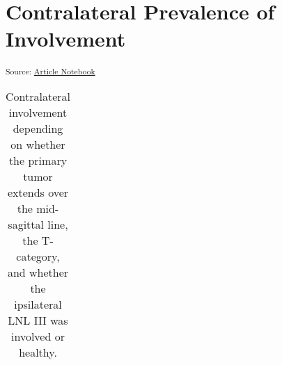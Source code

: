 \documentclass[
  sn-mathphys-num,
]{sn-jnl}
\begin{document}
\section{Contralateral Prevalence of
Involvement}\label{contralateral-prevalence-of-involvement}

\textsubscript{Source:
\href{https://rmnldwg.github.io/bilateral-paper/manuscript.qmd.html}{Article
Notebook}}

\begin{longtable}[]{@{}llllllllllll@{}}

\caption{\label{tbl-data-strat}Contralateral involvement depending on
whether the primary tumor extends over the mid-sagittal line, the
T-category, and whether the ipsilateral LNL III was involved or
healthy.}

\tabularnewline


\end{longtable}
\end{document}
